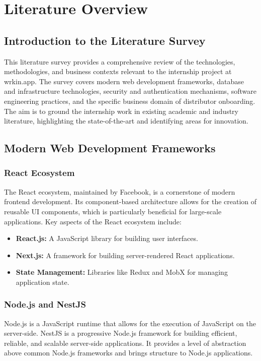 \chapter{Literature Overview}

\section{Introduction to the Literature Survey}
This literature survey provides a comprehensive review of the technologies, methodologies, and business contexts relevant to the internship project at wrkin.app. The survey covers modern web development frameworks, database and infrastructure technologies, security and authentication mechanisms, software engineering practices, and the specific business domain of distributor onboarding. The aim is to ground the internship work in existing academic and industry literature, highlighting the state-of-the-art and identifying areas for innovation.

\section{Modern Web Development Frameworks}

\subsection{React Ecosystem}
The React ecosystem, maintained by Facebook, is a cornerstone of modern frontend development. Its component-based architecture allows for the creation of reusable UI components, which is particularly beneficial for large-scale applications. Key aspects of the React ecosystem include:
\begin{itemize}
    \item \textbf{React.js:} A JavaScript library for building user interfaces.
    \item \textbf{Next.js:} A framework for building server-rendered React applications.
    \item \textbf{State Management:} Libraries like Redux and MobX for managing application state.
\end{itemize}

\subsection{Node.js and NestJS}
Node.js is a JavaScript runtime that allows for the execution of JavaScript on the server-side. NestJS is a progressive Node.js framework for building efficient, reliable, and scalable server-side applications. It provides a level of abstraction above common Node.js frameworks and brings structure to Node.js applications.

